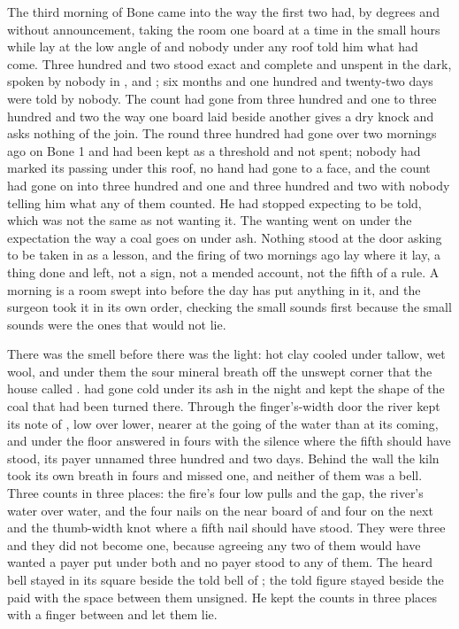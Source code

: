 
The third morning of Bone came into  the way the first two had, by degrees and without announcement, taking the room one board at a time in the small hours while  lay at the low angle of  and nobody under any roof told him what had come. Three hundred and two stood exact and complete and unspent in the dark, spoken by nobody in ,  and ; six months and one hundred and twenty-two days were told by nobody. The count had gone from three hundred and one to three hundred and two the way one board laid beside another gives a dry knock and asks nothing of the join. The round three hundred had gone over two mornings ago on Bone 1 and had been kept as a threshold and not spent; nobody had marked its passing under this roof, no hand had gone to a face, and the count had gone on into three hundred and one and three hundred and two with nobody telling him what any of them counted. He had stopped expecting to be told, which was not the same as not wanting it. The wanting went on under the expectation the way a coal goes on under ash. Nothing stood at the door asking to be taken in as a lesson, and the firing of two mornings ago lay where it lay, a thing done and left, not a sign, not a mended account, not the fifth of a rule. A morning is a room swept into before the day has put anything in it, and the surgeon took it in its own order, checking the small sounds first because the small sounds were the ones that would not lie.

There was the smell before there was the light: hot clay cooled under tallow, wet wool, and under them the sour mineral breath off the unswept corner that the house called .  had gone cold under its ash in the night and kept the shape of the coal that had been turned there. Through the finger's-width door the river kept its note of , low over lower, nearer at the going of the water than at its coming, and under the floor  answered in fours with the silence where the fifth should have stood, its payer unnamed three hundred and two days. Behind the wall the kiln took its own breath in fours and missed one, and neither of them was a bell. Three counts in three places: the fire's four low pulls and the gap, the river's water over water, and the four nails on the near board of  and four on the next and the thumb-width knot where a fifth nail should have stood. They were three and they did not become one, because agreeing any two of them would have wanted a payer put under both and no payer stood to any of them. The heard bell stayed in its square beside the told bell of ; the told figure stayed beside the paid with the space between them unsigned. He kept the counts in three places with a finger between and let them lie.

